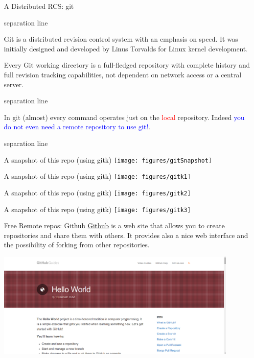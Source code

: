 \documentclass[hyperref={colorlinks}]{beamer}
\newcommand{\titleline}[1][0.025cm]{%
\begin{beamercolorbox}[wd=\paperwidth,ht=#1,center]{separation line}%
\end{beamercolorbox}%
}
\begin{document}
\begin{frame}{A Distributed RCS: git}
\titleline
{%
\small
\RaggedRight
Git is a distributed revision control system with an emphasis on speed.
It was initially designed and developed by Linus Torvalds for Linux kernel development. 
\smallskip

\alert{Every Git working directory is a full-fledged repository
with complete history and full revision tracking capabilities, not dependent on network access or a central server.}
}%
\titleline

In git (almost) every command operates just on the  \textcolor{red}{local}
repository. Indeed \textcolor{blue}{you do not even need a remote repository to use git!}.
\titleline
\end{frame}

\begin{frame}{A snapshot of this repo (using gitk)}
  \texttt{[image: figures/gitSnapshot]}
\end{frame}

\begin{frame}{A snapshot of this repo (using gitk)}
  \texttt{[image: figures/gitk1]}
\end{frame}
\begin{frame}{A snapshot of this repo (using gitk)}
  \texttt{[image: figures/gitk2]}
\end{frame}
\begin{frame}{A snapshot of this repo (using gitk)}
  \texttt{[image: figures/gitk3]}
\end{frame}

\begin{frame}{Free Remote repos: Github}
\href{https://github.com/}{Github} is a web site that allows you to create repositories and share them with others. 
It provides also a nice web interface and the possibility of forking from other repositories. 

\medskip

\centerline{
\includegraphics[width=0.9\textwidth]{figures/github}
}
\end{frame}
\end{document}
